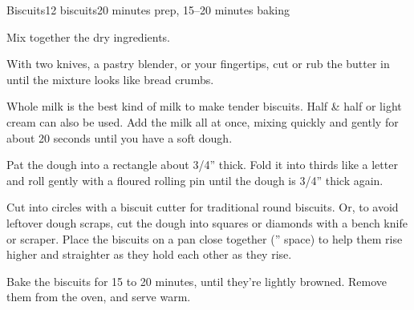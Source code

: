 \documentclass[../Cookbook.tex]{subfiles}
\begin{document}
\begin{recipe}[Biscuits]{Biscuits}{12 biscuits}{20 minutes prep, 15--20 minutes baking}



Mix together the dry ingredients.

With two knives, a pastry blender, or your fingertips, cut or rub the butter in until the mixture looks like bread crumbs.

Whole milk is the best kind of milk to make tender biscuits. Half \& half or light cream can also be used.
Add the milk all at once, mixing quickly and gently for about 20 seconds until you have a soft dough.

Pat the dough into a rectangle about 3/4'' thick. Fold it into thirds like a letter and roll gently with a floured rolling pin until the dough is 3/4'' thick again.

Cut into circles with a biscuit cutter for traditional round biscuits. Or, to avoid leftover dough scraps, cut the dough into squares or diamonds with a bench knife or scraper.
Place the biscuits on a pan close together ('' space) to help them rise higher and straighter as they hold each other as they rise.

Bake the biscuits for 15 to 20 minutes, until they're lightly browned. Remove them from the oven, and serve warm.


\end{recipe}
\end{document}
